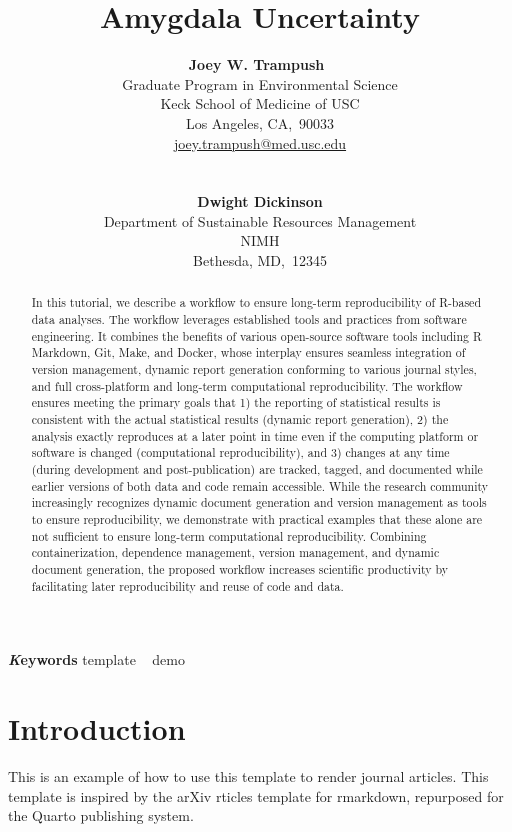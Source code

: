 \documentclass[
]{article}
\title{Amygdala Uncertainty}
\author{
\textbf{Joey W. Trampush}~\orcidlink{0000-0003-0830-508X}\\Graduate
Program in Environmental Science\\Keck School of Medicine of USC\\Los
Angeles,
CA,\ 90033\\\href{mailto:joey.trampush@med.usc.edu}{joey.trampush@med.usc.edu}\\\\\\
\textbf{Dwight Dickinson}\\Department of Sustainable Resources
Management\\NIMH\\Bethesda, MD,\ 12345\\}
\date{}
\begin{document}
\maketitle
\begin{abstract}
In this tutorial, we describe a workflow to ensure long-term
reproducibility of R-based data analyses. The workflow leverages
established tools and practices from software engineering. It combines
the benefits of various open-source software tools including R Markdown,
Git, Make, and Docker, whose interplay ensures seamless integration of
version management, dynamic report generation conforming to various
journal styles, and full cross-platform and long-term computational
reproducibility. The workflow ensures meeting the primary goals that 1)
the reporting of statistical results is consistent with the actual
statistical results (dynamic report generation), 2) the analysis exactly
reproduces at a later point in time even if the computing platform or
software is changed (computational reproducibility), and 3) changes at
any time (during development and post-publication) are tracked, tagged,
and documented while earlier versions of both data and code remain
accessible. While the research community increasingly recognizes dynamic
document generation and version management as tools to ensure
reproducibility, we demonstrate with practical examples that these alone
are not sufficient to ensure long-term computational reproducibility.
Combining containerization, dependence management, version management,
and dynamic document generation, the proposed workflow increases
scientific productivity by facilitating later reproducibility and reuse
of code and data.
\end{abstract}
{\bfseries \emph Keywords}
\def\sep{\textbullet\ }
template \sep 
demo

\ifdefined\Shaded\renewenvironment{Shaded}{\begin{tcolorbox}[boxrule=0pt, borderline west={3pt}{0pt}{shadecolor}, sharp corners, interior hidden, enhanced, breakable, frame hidden]}{\end{tcolorbox}}\fi

\hypertarget{sec-intro}{%
\section{Introduction}\label{sec-intro}}

This is an example of how to use this template to render journal
articles. This template is inspired by the arXiv rticles template for
rmarkdown, repurposed for the Quarto publishing system.
\end{document}
